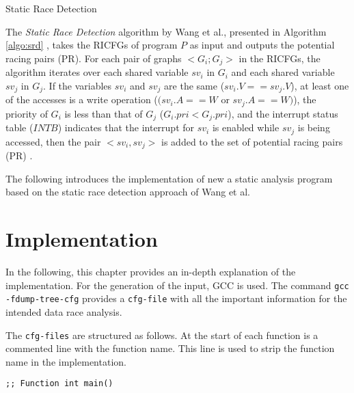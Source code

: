 \documentclass[
fancyheadings, %
%
%
]{stsreprt}
\begin{document}
{		\begin{algorithm}[H]
			\label{algo:srd}
			\caption{Static Race Detection}
			
			\BlankLine
		\end{algorithm}
		
		The \textit{Static Race Detection} algorithm by Wang et al., presented in Algorithm \ref{algo:srd} , takes the \acp{RICFG} of program $P$ as input and outputs the potential racing pairs (PR). For each pair of graphs $< G_i ; G_j >$ in the \acp{RICFG}, the algorithm iterates over each shared variable $sv_i$ in $G_i$ and each shared variable $sv_j$ in $G_j$. If the variables $sv_i$ and $sv_j$ are the same ($sv_i.V == sv_j.V$), at least one of the accesses is a write operation ($(sv_i.A == W$ or $sv_j.A == W)$), the priority of $G_i$ is less than that of $G_j$ ($G_i.pri < G_j.pri$), and the interrupt status table ($INTB$) indicates that the interrupt for $sv_i$ is enabled while $sv_j$ is being accessed, then the pair $<sv_i, sv_j>$ is added to the set of potential racing pairs (PR) \cite{wang2020}.
		
		The following introduces the implementation of new a static analysis program based on the static race detection approach of Wang et al.



\chapter{Implementation}
In the following, this chapter provides an in-depth explanation of the implementation. For the generation of the input, \ac{GCC} is used. The command \texttt{gcc -fdump-tree-cfg} provides a \mbox{\texttt{cfg-file}} with all the important information for the intended data race analysis.

The \texttt{cfg-files} are structured as follows. 
At the start of each function is a commented line with the function name. This line is used to strip the function name in the implementation.
\begin{lstlisting}
;; Function int main() 
\end{lstlisting}

}
\end{document}
